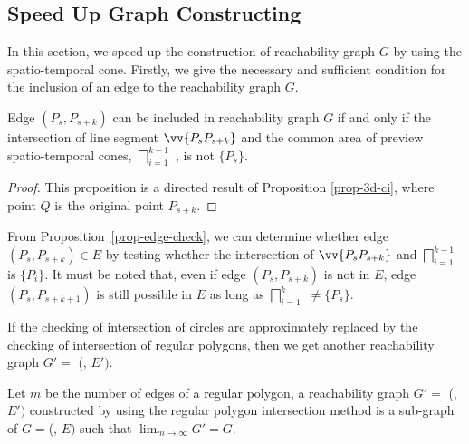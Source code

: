 \subsection{Speed Up Graph Constructing} %
In this section, we speed up the construction of reachability graph $G$ by using the spatio-temporal cone.
Firstly, we give the necessary and sufficient condition for the inclusion of an edge to the reachability graph $G$.

\begin{prop}
\label{prop-edge-check}
Edge $(P_{s}, P_{s+k})$ can be included in reachability graph $G$ if and only if the intersection of line segment $\vv{P_{s}P_{s+k}}$ and 
the common area of preview spatio-temporal cones, \ie $\bigsqcap_{i=1}^{k-1}$ , is not $\{P_s\}$.
\end{prop}

\begin{proof}
This proposition is a directed result of Proposition \ref{prop-3d-ci}, where point $Q$ is the original point $P_{s+k}$. 
\end{proof}


From Proposition~\ref{prop-edge-check}, we can determine whether edge $(P_s, P_{s+k}) \in E$ by testing whether the intersection of $\vv{P_sP_{s+k}}$ and $\bigsqcap_{i=1}^{k - 1}$ is $\{P_i\}$. 
It must be noted that, even if edge $(P_s, P_{s+k})$ is not in $E$, edge $(P_s, P_{s+k+1})$ is still possible in $E$ as long as $\bigsqcap_{i=1}^{k}$ $\ne \{P_s\}$.


%
If the checking of intersection of circles are approximately replaced by the checking of intersection of regular polygons, then we get another reachability graph $G'=$ (, $E')$.

\begin{prop}
	\label{prop-near-opt-graph}
	Let $m$ be the number of edges of a regular polygon,
	a reachability graph $G'=$ (, $E')$ constructed by using the regular polygon intersection method is a sub-graph of $G=$(, $E)$ such that $\lim_{m \to \infty}{G'=G}$.
\end{prop}

